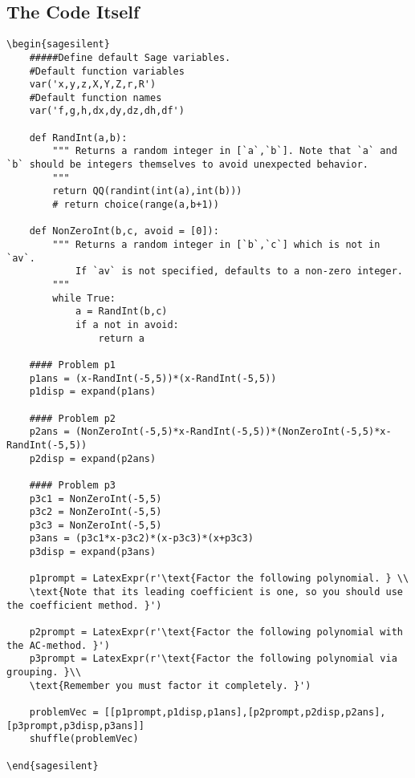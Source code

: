 \documentclass{ximera}
\begin{document}
    \subsection{The Code Itself}
        \begin{verbatim}
\begin{sagesilent}
    #####Define default Sage variables.
    #Default function variables
    var('x,y,z,X,Y,Z,r,R')
    #Default function names
    var('f,g,h,dx,dy,dz,dh,df')
    
    def RandInt(a,b):
        """ Returns a random integer in [`a`,`b`]. Note that `a` and `b` should be integers themselves to avoid unexpected behavior.
        """
        return QQ(randint(int(a),int(b)))
        # return choice(range(a,b+1))
    
    def NonZeroInt(b,c, avoid = [0]):
        """ Returns a random integer in [`b`,`c`] which is not in `av`. 
            If `av` is not specified, defaults to a non-zero integer.
        """
        while True:
            a = RandInt(b,c)
            if a not in avoid:
                return a
    
    #### Problem p1
    p1ans = (x-RandInt(-5,5))*(x-RandInt(-5,5))
    p1disp = expand(p1ans)
    
    #### Problem p2
    p2ans = (NonZeroInt(-5,5)*x-RandInt(-5,5))*(NonZeroInt(-5,5)*x-RandInt(-5,5))
    p2disp = expand(p2ans)
    
    #### Problem p3
    p3c1 = NonZeroInt(-5,5)
    p3c2 = NonZeroInt(-5,5)
    p3c3 = NonZeroInt(-5,5)
    p3ans = (p3c1*x-p3c2)*(x-p3c3)*(x+p3c3)
    p3disp = expand(p3ans)
    
    p1prompt = LatexExpr(r'\text{Factor the following polynomial. } \\ 
    \text{Note that its leading coefficient is one, so you should use the coefficient method. }')
    
    p2prompt = LatexExpr(r'\text{Factor the following polynomial with the AC-method. }')
    p3prompt = LatexExpr(r'\text{Factor the following polynomial via grouping. }\\ 
    \text{Remember you must factor it completely. }')
    
    problemVec = [[p1prompt,p1disp,p1ans],[p2prompt,p2disp,p2ans],[p3prompt,p3disp,p3ans]]
    shuffle(problemVec)
    
\end{sagesilent}
    

\end{verbatim}
\end{document}
